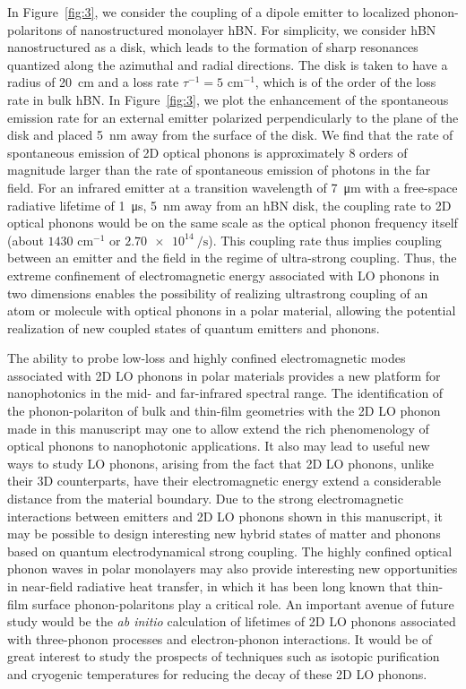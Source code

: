 \documentclass[aps,prb,twocolumn,
	           groupedaddress,superscriptaddress,
               amsfonts,amssymb,amsmath,floatfix,
	           citeautoscript]{revtex4-1}
\begin{document}
In Figure~\ref{fig:3}, we consider the coupling of a dipole emitter to localized phonon-polaritons of nanostructured monolayer hBN. For simplicity, we consider hBN nanostructured as a disk, which leads to the formation of sharp resonances quantized along the azimuthal and radial directions. The disk is taken to have a radius of \SI{20}{cm} and a loss rate $\tau^{-1} = 5$ cm$^{-1}$, which is of the order of the loss rate in bulk hBN. In Figure~\ref{fig:3}, we plot the enhancement of the spontaneous emission rate for an external emitter polarized perpendicularly to the plane of the disk and placed \SI{5}{\nm} away from the surface of the disk. We find that the rate of spontaneous emission of 2D optical phonons is approximately 8 orders of magnitude larger than the rate of spontaneous emission of photons in the far field. For an infrared emitter at a transition wavelength of \SI{7}{\micro\m} with a free-space radiative lifetime of \SI{1}{\micro\s}, \SI{5}{\nm} away from an hBN disk, the coupling rate to 2D optical phonons would be on the same scale as the optical phonon frequency itself (about $1430$ cm$^{-1}$ or $\SI{2.70e14}{\per\s}$). 
This coupling rate thus implies coupling between an emitter and the field in the regime of ultra-strong coupling. Thus, the extreme confinement of electromagnetic energy associated with LO phonons in two dimensions enables the possibility of realizing ultrastrong coupling of an atom or molecule with optical phonons in a polar material, allowing the potential realization of new coupled states of quantum emitters and phonons.

The ability to probe low-loss and highly confined electromagnetic modes associated with 2D LO phonons in polar materials provides a new platform for nanophotonics in the mid- and far-infrared spectral range. The identification of the phonon-polariton of bulk and thin-film geometries with the 2D LO phonon made in this manuscript may one to allow extend the rich phenomenology of optical phonons to nanophotonic applications. It also may lead to useful new ways to study LO phonons, arising from the fact that 2D LO phonons, unlike their 3D counterparts, have their electromagnetic energy extend a considerable distance from the material boundary. Due to the strong electromagnetic interactions between emitters and 2D LO phonons shown in this manuscript, it may be possible to design interesting new hybrid states of matter and phonons based on quantum electrodynamical strong coupling. The highly confined optical phonon waves in polar monolayers may also provide interesting new opportunities in near-field radiative heat transfer, in which it has been long known that thin-film surface phonon-polaritons play a critical role. An important avenue of future study would be the \textit{ab initio} calculation of lifetimes of 2D LO phonons associated with three-phonon processes and electron-phonon interactions. It would be of great interest to study the prospects of techniques such as isotopic purification and cryogenic temperatures for reducing the decay of these 2D LO phonons.
\end{document}
